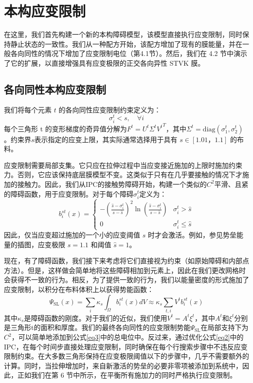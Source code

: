 \section{本构应变限制}

在这里，我们首先构建一个新的本构障碍模型，该模型直接执行应变限制，同时保持静止状态的一致性。我们从一种配方开始，该配方增加了现有的膜能量，并在一般各向同性的情况下增加了应变限制电位（第4.1节）。然后，我们在 4.2 节中演示了它的扩展，以直接增强具有应变极限的正交各向异性 STVK 膜。

\subsection{各向同性本构应变限制}

我们将每个元素 $t$ 的各向同性应变限制约束定义为：
\begin{equation}
  \sigma _i ^t < s, \quad \forall i
\end{equation}
每个三角形 t 的变形梯度的奇异值分解为$F^t = U^t\Sigma^t{V^t}^T$，其中$\Sigma^t = \mathrm{diag} (\sigma_1^t, \sigma_2^t)$。约束界$s$表示指定的应变上限，其实际通常选择用于具有 $s\in [1.01， 1.1]$ 的布料。

应变限制需要局部支集。它只应在拉伸过程中当应变接近施加的上限时施加约束力。否则，它应该保持底层膜模型不变。这类似于只有在几乎要接触的情况下才施加的接触力。因此，我们从IPC的接触势障碍开始，构建一个类似的$C^2$平滑、且紧的障碍函数，用于应变限制。对于每个障碍$\sigma_i^t$定义为：
\begin{equation}
  b_i^{st}(x) = \begin{cases}
    -(\frac{\hat s - \sigma_i^t}{s - \hat s})^2\ln(\frac{\hat s - \sigma_i^t}{s - \hat s})& \sigma_i^t > \hat s\\
    0 & \sigma_i^t \le \hat s
  \end{cases}
\end{equation}
因此，仅当应变超过施加的一个小的应变阈值 $s$ 时才会激活。例如，参见势垒能量的插图，应变极限 $s = 1.1$ 和阈值 $\hat s = 1$。

现在，有了障碍函数，我们接下来考虑将它们直接视为约束（如原始障碍和内部点方法）。但是，这样做会简单地将这些障碍相加到元素上，因此在我们更改网格时会获得不一致的行为。相反，为了提供一致的行为，我们以能量密度的形式施加了应变限制，以积分在布料体积上以获得势能函数：
\begin{equation}
  \Psi _{\mathrm{SL}} (x) = \sum_i \kappa_s \int _ \Omega b_i^{st} (x) dV
  \approx \kappa_s \sum_{t, i} V^t b_i^{st}(x)
\end{equation}
其中$\kappa_s$是障碍函数的刚度。对于我们的近似，我们使用$V^t = A^t \xi^t$，其中$A^t$和$\xi^t$分别是三角形t的面积和厚度。我们的最终各向同性的应变限制势能$\Psi_{\mathrm {SL}}$在局部支持下为$C^2$，可以简单地添加到公式\ref{eq3}中的总电位中。反过来，通过优化公式\ref{eq2}中的IPC，在每个时间步直接处理应变限制，同时确保在每个行搜索步骤中不违反应变限制约束。在大多数三角形保持在应变极限阈值以下的步骤中，几乎不需要额外的计算。同时，当拉伸增加时，来自新激活的势垒的必要非零项被添加到系统中，因此，正如我们在第 6 节中所示，在平衡所有施加力的同时严格执行应变限制。

